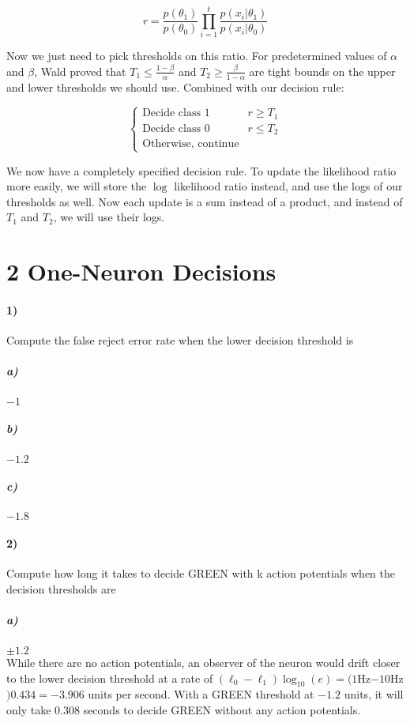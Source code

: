 \documentclass[10pt,letter]{article}
\begin{document}
\[ r = \frac{p(\theta_1)}{p(\theta_0)}\prod_{i=1}^{t}\frac{p(x_i | \theta_1)}{p(x_i | \theta_0)}\]

Now we just need to pick thresholds on this ratio.  For predetermined values of $\alpha$ and 
$\beta$, Wald proved that $T_1 \leq \frac{1 - \beta}{\alpha}$ and $T_2 \geq \frac{\beta}
{1 - \alpha}$ are tight bounds on the upper and lower thresholds we should use. Combined with 
our decision rule:

\[ \begin{cases}
   \text{Decide class 1} & r \geq T_1 \\
   \text{Decide class 0} & r \leq T_2 \\
   \text{Otherwise, continue}
   \end{cases}
\]

We now have a completely specified decision rule.  To update the likelihood ratio more easily, 
we will store the $\log$ likelihood ratio instead, and use the logs of our thresholds as well.  
Now each update is a sum instead of a product, and instead of $T_1$ and $T_2$, we will use their
logs.

\section*{2 One-Neuron Decisions}

\paragraph{1)} Compute the false reject error rate when the lower decision threshold is

\subparagraph{a)} $-1$

\subparagraph{b)} $-1.2$

\subparagraph{c)} $-1.8$

\paragraph{2)} Compute how long it takes to decide GREEN with k action potentials when the decision
thresholds are

\subparagraph{a)} $\pm 1.2$\\

While there are no action potentials, an observer of the neuron would drift closer to the lower 
decision threshold at a rate of $(\ell_0 - \ell_1)\log_{10}(e) = (1 $Hz$ - 10 $Hz$)  0.434 = -3.906$
units per second. With a GREEN threshold at $-1.2$ units, it will only take $0.308$ seconds to 
decide GREEN without any action potentials.\\
\end{document}
